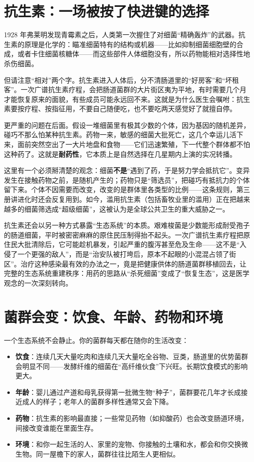 \section{抗生素：一场被按了快进键的选择}

1928 年弗莱明发现青霉素之后，人类第一次握住了对细菌“精确轰炸”的武器。抗生素的原理是化学的：瞄准细菌特有的结构或机器——比如抑制细菌细胞壁的合成，或者卡住细菌核糖体——而这些部件人体细胞没有，所以药物能相对选择性地杀伤细菌。

但请注意“相对”两个字。抗生素进入人体后，分不清肠道里的“好房客”和“坏租客”。一次广谱抗生素疗程，会把肠道菌群的大片街区夷为平地，有时需要几个月才能恢复原来的面貌，有些成员可能永远回不来。这就是为什么医生会嘱咐：抗生素要按疗程、按指征用，不要自己随便吃，也不要吃两天感觉好了就擅自停。

更严重的问题在后面。假设一堆细菌里有极其少数的个体，因为基因的随机差异，碰巧不那么怕某种抗生素。药物一来，敏感的细菌大批死亡，这几个幸运儿活下来，面前突然空出了一大片地盘和食物——它们迅速繁殖，下一代整个群体都不怕这种药了。这就是\textbf{耐药性}，它本质上是自然选择在几星期内上演的实况转播。

这里有一个必须掰清楚的观念：细菌\textbf{不是}“遇到了药，于是努力学会抵抗它”。变异发生在接触药物之前，是随机产生的；药物只是“筛选员”，把碰巧有抵抗力的个体留下来。个体不因需要而改变，改变的是群体里各类型的比例——这条规则，第三册讲进化时还会反复用到。如今，滥用抗生素（包括畜牧业里的滥用）正在把越来越多的细菌筛选成“超级细菌”，这被认为是全球公共卫生的重大威胁之一。

抗生素还会以另一种方式暴露“生态系统”的本质。艰难梭菌是少数能形成耐受孢子的肠道细菌，平时被密密麻麻的原住民压制得抬不起头。一次广谱抗生素疗程把原住民大批清除后，它可能趁机暴发，引起严重的腹泻甚至危及生命——这不是“入侵了一个更强的敌人”，而是“治安队被打垮后，原本不起眼的小混混占领了街区”。治疗这种感染最有效的办法之一，竟是把健康供体的肠道菌群移植回去，让完整的生态系统重建秩序：用药的思路从“杀死细菌”变成了“恢复生态”，这是医学观念的一次深刻转向。

\section{菌群会变：饮食、年龄、药物和环境}

一个生态系统不会静止。你的菌群每天都在随你的生活改变：

\begin{itemize}[itemsep=2pt]
\item \textbf{饮食}：连续几天大量吃肉和连续几天大量吃全谷物、豆类，肠道里的优势菌群会明显不同——发酵纤维的细菌在“高纤维伙食”下兴旺。长期饮食模式的影响更大。
\item \textbf{年龄}：婴儿通过产道和母乳获得第一批微生物“种子”，菌群要花几年才长成接近成人的样子；老年人的菌群多样性通常又会下降。
\item \textbf{药物}：抗生素的影响最直接；一些常见药物（如抑酸药）也会改变肠道环境，间接改变谁能在里面生存。
\item \textbf{环境}：和你一起生活的人、家里的宠物、你接触的土壤和水，都会和你交换微生物。同一屋檐下的家人，菌群往往比陌生人更相似。
\end{itemize}

